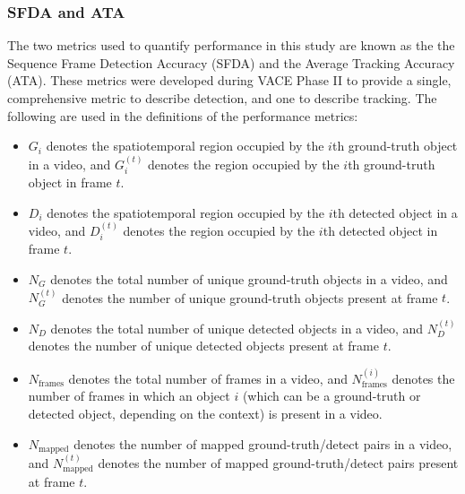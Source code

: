 \documentclass[twocolumn, final]{svjour3}
\begin{document}



\subsubsection{SFDA and ATA}

The two metrics used to quantify performance in this study are known as the the Sequence Frame Detection Accuracy (SFDA) and the Average Tracking Accuracy (ATA). These metrics were developed during VACE Phase II to provide a single, comprehensive metric to describe detection, and one to describe tracking. The following are used in the definitions of the performance metrics:
\begin{itemize}
\renewcommand{\labelitemi}{$\bullet$}
\item $G_{i}$ denotes the spatiotemporal region occupied by the $i$th ground-truth object in a video, and $G_{i}^{(t)}$ denotes the region occupied by the $i$th ground-truth object in frame $t$.
\vspace{2mm}
\item $D_{i}$ denotes the spatiotemporal region occupied by the $i$th detected object in a video, and $D_{i}^{(t)}$ denotes the region occupied by the $i$th detected object in frame $t$.
\vspace{2mm}
\item $N_{G}$ denotes the total number of unique ground-truth objects in a video, and $N_{G}^{(t)}$ denotes the number of unique ground-truth objects present at frame $t$.
\vspace{2mm}
\item $N_{D}$ denotes the total number of unique detected objects in a video, and $N_{D}^{(t)}$ denotes the number of unique detected objects present at frame $t$.
\vspace{2mm}
\item $N_{\text{frames}}$ denotes the total number of frames in a video, and $N_{\text{frames}}^{(i)}$ denotes the number of frames in which an object $i$ (which can be a ground-truth or detected object, depending on the context) is present in a video.
\vspace{2mm}
\item $N_{\text{mapped}}$ denotes the number of mapped ground-truth/detect pairs in a video, and $N_{\text{mapped}}^{(t)}$ denotes the number of mapped ground-truth/detect pairs present at frame $t$.
\vspace{1mm}
\end{itemize}
\end{document}
